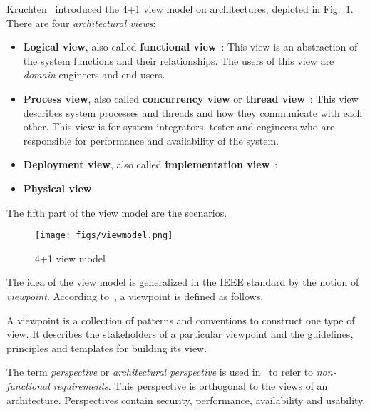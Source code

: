\documentclass{llncs} %
\begin{document}
Kruchten~\cite{Kruchten1995T41} introduced the 4+1 view model on architectures,
depicted in Fig.~\ref{fig:viewmodel}.
There are four \emph{architectural views}:
\begin{itemize}
	\item \textbf{Logical view}, also called \textbf{functional view}~\cite{Clements2001ESA}:
	        This view is an abstraction of the system functions and their relationships. The users
					 of this view are  \emph{domain} engineers and end users.
	\item \textbf{Process view}, also called \textbf{concurrency view}
	                or \textbf{thread view}~\cite{Clements2001ESA}:
									 This view describes system processes and threads and how they communicate with each other.
									This view is for system integrators, tester and engineers who are
									responsible for performance and availability of the system.
	 \item \textbf{Deployment view}, also called \textbf{implementation view}~\cite{Clements2001ESA}:
                     
	 \item \textbf{Physical view}
\end{itemize}

The fifth part of the view model are the scenarios.

\begin{figure}%
\begin{center}
\texttt{[image: figs/viewmodel.png]}%
\caption{4+1 view model}%
\label{fig:viewmodel}%
\end{center}
\end{figure}

The idea of the view model is generalized in the IEEE standard  by the notion of \emph{viewpoint}.
According to~\cite{Rozanski2005SSA}, a viewpoint is defined as follows.

\begin{definition}[Viewpoint]
A viewpoint is a collection of patterns and conventions to construct one type of view.
It describes the stakeholders of a particular viewpoint and the
guidelines, principles and templates for building its view.
\end{definition}

The term \emph{perspective} or \emph{architectural perspective} is used in~\cite{Rozanski2005SSA}
to refer to \emph{non-functional requirements}. This perspective is orthogonal to
the views of an architecture. Perspectives contain security, performance, availability and usability.
\end{document}
